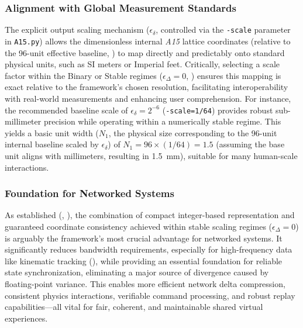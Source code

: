 \documentclass[10pt]{article}
\def\AAAB{\textit{A15}}
\begin{document}
\subsubsection{Alignment with Global Measurement Standards}\label{subsubsec-apps-measurement}
The explicit output scaling mechanism ($\epsilon_\delta$, controlled via the \texttt{-scale} parameter in \texttt{A15.py}) allows the dimensionless internal \AAAB{} lattice coordinates (relative to the 96-unit effective baseline, ) to map directly and predictably onto standard physical units, such as SI meters or Imperial feet. Critically, selecting a scale factor within the Binary or Stable regimes ($\epsilon_\Delta=0$, ) ensures this mapping is exact relative to the framework's chosen resolution, facilitating interoperability with real-world measurements and enhancing user comprehension. For instance, the recommended baseline scale of $\epsilon_\delta = 2^{-6}$ (\texttt{-scale=1/64}) provides robust sub-millimeter precision while operating within a numerically stable regime. This yields a basic unit width ($N_1$, the physical size corresponding to the 96-unit internal baseline scaled by $\epsilon_\delta$) of $N_1 = 96 \times (1/64) = 1.5$ (assuming the base unit aligns with millimeters, resulting in \SI{1.5}{\milli\meter}), suitable for many human-scale interactions.

\subsubsection{Foundation for Networked Systems}\label{subsubsec-apps-network}
As established (, ), the combination of compact integer-based representation and guaranteed coordinate consistency achieved within stable scaling regimes ($\epsilon_\Delta = 0$) is arguably the framework's most crucial advantage for networked systems. It significantly reduces bandwidth requirements, especially for high-frequency data like kinematic tracking (), while providing an essential foundation for reliable state synchronization, eliminating a major source of divergence caused by floating-point variance. This enables more efficient network delta compression, consistent physics interactions, verifiable command processing, and robust replay capabilities—all vital for fair, coherent, and maintainable shared virtual experiences.
\end{document}
